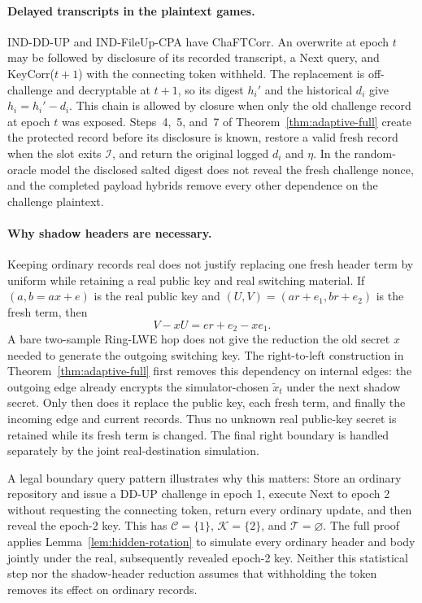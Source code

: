 \paragraph{Delayed transcripts in the plaintext games.}
IND-DD-UP and IND-FileUp-CPA have ChaFTCorr. An overwrite at epoch $t$ may be followed by disclosure of its recorded transcript, a Next query, and KeyCorr($t+1$) with the connecting token withheld. The replacement is off-challenge and decryptable at $t+1$, so its digest $h_i'$ and the historical $d_i$ give $h_i=h_i'-d_i$. This chain is allowed by closure when only the old challenge record at epoch $t$ was exposed. Steps~4,~5, and~7 of Theorem~\ref{thm:adaptive-full} create the protected record before its disclosure is known, restore a valid fresh record when the slot exits $\mathcal I$, and return the original logged $d_i$ and $\eta$. In the random-oracle model the disclosed salted digest does not reveal the fresh challenge nonce, and the completed payload hybrids remove every other dependence on the challenge plaintext.

\paragraph{Why shadow headers are necessary.}
Keeping ordinary records real does not justify replacing one fresh header term by uniform while retaining a real public key and real switching material. If $(a,b=ax+e)$ is the real public key and $(U,V)=(ar+e_1,br+e_2)$ is the fresh term, then
\[
 V-xU=er+e_2-xe_1.
\]
A bare two-sample Ring-LWE hop does not give the reduction the old secret $x$ needed to generate the outgoing switching key. The right-to-left construction in Theorem~\ref{thm:adaptive-full} first removes this dependency on internal edges: the outgoing edge already encrypts the simulator-chosen $\widetilde x_t$ under the next shadow secret. Only then does it replace the public key, each fresh term, and finally the incoming edge and current records. Thus no unknown real public-key secret is retained while its fresh term is changed. The final right boundary is handled separately by the joint real-destination simulation.

A legal boundary query pattern illustrates why this matters: Store an ordinary repository and issue a DD-UP challenge in epoch 1, execute Next to epoch 2 without requesting the connecting token, return every ordinary update, and then reveal the epoch-2 key. This has $\mathcal C=\{1\}$, $\mathcal K=\{2\}$, and $\mathcal T=\varnothing$. The full proof applies Lemma~\ref{lem:hidden-rotation} to simulate every ordinary header and body jointly under the real, subsequently revealed epoch-2 key. Neither this statistical step nor the shadow-header reduction assumes that withholding the token removes its effect on ordinary records.

